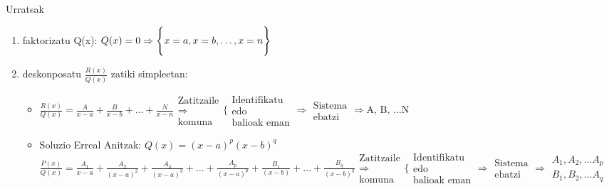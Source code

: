 \documentclass[8pt]{article}
\begin{document}
				Urratsak
			\begin{enumerate}
				\item faktorizatu Q(x): $ Q(x) = 0 \Rightarrow
					\Bigg{ \{ } 
						x = a, 
						x = b, 
						\dots,
						x = n 
					\Bigg{ \} } $
				\item deskonposatu $ \frac{R(x)}{Q(x)} $ zatiki simpleetan:
					\begin{itemize}
						\item $ \frac{R(x)}{Q(x)} = \frac{A}{x-a} + \frac{B}{x-b}
							+ \dots + \frac{N}{x-n}
							\begin{array}{c}
								\text{Zatitzaile}\\
								\Rightarrow\\
								\text{komuna}
							\end{array}
							\Bigg \{ %
							\begin{array}{c}
								\text{Identifikatu}\\
								\text{edo}\\
								\text{balioak eman}
							\end{array}
							\Rightarrow
							\begin{array}{c}
								\text{Sistema}\\
								\text{ebatzi}
							\end{array} \Rightarrow \text{A, B, } \dots \text{N}$

						\item Soluzio Erreal Anitzak: $ Q(x) = (x-a)^p (x-b)^q $
							$ \frac{P(x)}{Q(x)} = \frac{A_1}{x-a} +
							\frac{A_2}{(x-a)^2} + \frac{A_3}{(x-a)^3} + \dots +
							\frac{A_p}{(x-a)^p} + \frac{B_1}{(x-b)} + \dots +
							\frac{B_q}{(x-b)^q} 
							\begin{array}{c}
								\text{Zatitzaile}\\
								\Rightarrow\\
								\text{komuna}
							\end{array}
							\Bigg \{
							\begin{array}{c}
								\text{Identifikatu}\\
								\text{edo}\\
								\text{balioak eman}
							\end{array}
							\Rightarrow
							\begin{array}{c}
								\text{Sistema}\\
								\text{ebatzi}
							\end{array} \Rightarrow 
							\begin{array}{l}
								A_1, A_2, \dots A_p\\
								B_1, B_2, \dots A_q
							\end{array}$


\end{itemize}
\end{enumerate}
\end{document}
